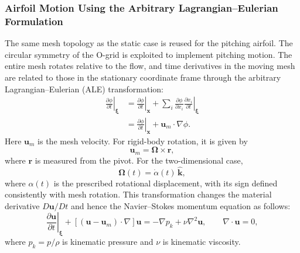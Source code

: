 \subsubsection{Airfoil Motion Using the Arbitrary Lagrangian--Eulerian Formulation}
The same mesh topology as the static case is reused for the pitching airfoil. The circular symmetry of the O-grid is exploited to implement pitching motion. The entire mesh rotates relative to the flow, and time derivatives in the moving mesh are related to those in the stationary coordinate frame through the arbitrary Lagrangian--Eulerian (ALE) transformation:
\begin{align}
\left.\frac{\partial\phi}{\partial t}\right|_{\boldsymbol\xi}
&=\left.\frac{\partial\phi}{\partial t}\right|_{\mathbf{x}}
+\sum_i\frac{\partial\phi}{\partial x_i}
\left.\frac{\partial x_i}{\partial t}\right|_{\boldsymbol\xi}\\
&=\left.\frac{\partial\phi}{\partial t}\right|_{\mathbf{x}}
+\mathbf{u}_m\cdot\nabla\phi.
\end{align}
Here $\mathbf{u}_m$ is the mesh velocity. For rigid-body rotation, it is given by
\begin{equation}
\mathbf{u}_m=\boldsymbol\Omega\times\mathbf{r},
\end{equation}
where $\mathbf{r}$ is measured from the pivot. For the two-dimensional case,
\begin{equation}
\boldsymbol\Omega(t)=\dot\alpha(t)\,\hat{\mathbf{k}},
\end{equation}
where $\alpha(t)$ is the prescribed rotational displacement, with its sign defined consistently with mesh rotation. This transformation changes the material derivative $D\mathbf{u}/Dt$ and hence the Navier--Stokes momentum equation as follows:
\begin{equation}
\left.\frac{\partial\mathbf{u}}{\partial t}\right|_{\boldsymbol\xi}
+[(\mathbf{u}-\mathbf{u}_m)\cdot\nabla]\mathbf{u}
=-\nabla p_k+\nu\nabla^2\mathbf{u},
\qquad \nabla\cdot\mathbf{u}=0,
\end{equation}
where $p_k=p/\rho$ is kinematic pressure and $\nu$ is kinematic viscosity.

